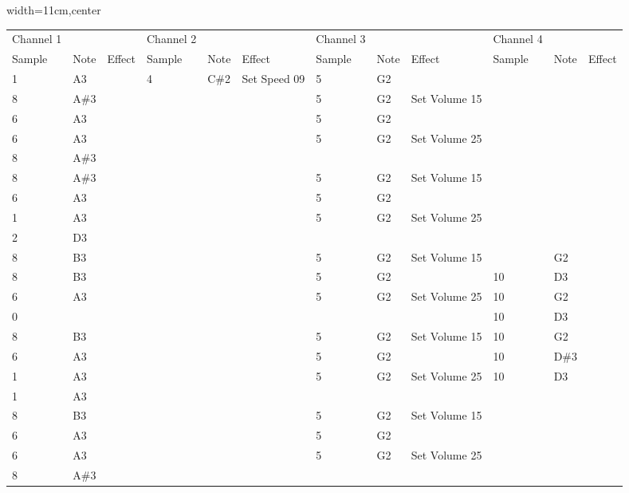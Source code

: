 \begin{figure}[H]
  {
    \setlength{\tabcolsep}{3.0pt}
    \setlength\cmidrulewidth{\heavyrulewidth} %
    \begin{adjustbox}{width=11cm,center}
      \begin{tabular}{llllllllllll}
        \toprule
Channel 1 &  &  & Channel 2 &  &  & Channel 3 &  &  & Channel 4 &  &  \\
Sample & Note & Effect & Sample & Note & Effect & Sample & Note & Effect & Sample & Note & Effect \\
        \midrule
1 & A3 &   & 4 & C\#2 & Set Speed 09 & 5 & G2 &   &   &   &   \\
8 & A\#3 &   &   &   &   & 5 & G2 & Set Volume 15 &   &   &   \\
6 & A3 &   &   &   &   & 5 & G2 &   &   &   &   \\
6 & A3 &   &   &   &   & 5 & G2 & Set Volume 25 &   &   &   \\
8 & A\#3 &   &   &   &   &   &   &   &   &   &   \\
8 & A\#3 &   &   &   &   & 5 & G2 & Set Volume 15 &   &   &   \\
6 & A3 &   &   &   &   & 5 & G2 &   &   &   &   \\
1 & A3 &   &   &   &   & 5 & G2 & Set Volume 25 &   &   &   \\
2 & D3 &   &   &   &   &   &   &   &   &   &   \\
8 & B3 &   &   &   &   & 5 & G2 & Set Volume 15 &   & G2 &   \\
8 & B3 &   &   &   &   & 5 & G2 &   & 10 & D3 &   \\
6 & A3 &   &   &   &   & 5 & G2 & Set Volume 25 & 10 & G2 &   \\
0 &   &   &   &   &   &   &   &   & 10 & D3 &   \\
8 & B3 &   &   &   &   & 5 & G2 & Set Volume 15 & 10 & G2 &   \\
6 & A3 &   &   &   &   & 5 & G2 &   & 10 & D\#3 &   \\
1 & A3 &   &   &   &   & 5 & G2 & Set Volume 25 & 10 & D3 &   \\
1 & A3 &   &   &   &   &   &   &   &   &   &   \\
8 & B3 &   &   &   &   & 5 & G2 & Set Volume 15 &   &   &   \\
6 & A3 &   &   &   &   & 5 & G2 &   &   &   &   \\
6 & A3 &   &   &   &   & 5 & G2 & Set Volume 25 &   &   &   \\
8 & A\#3 &   &   &   &   &   &   &   &   &   &   \\

\end{tabular}
\end{adjustbox}}
\end{figure}
